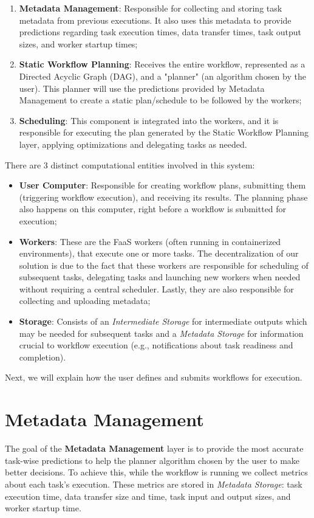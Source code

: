 \begin{enumerate}
    \item \textbf{Metadata Management}: Responsible for collecting and storing task metadata from previous executions. It also uses this metadata to provide predictions regarding task execution times, data transfer times, task output sizes, and worker startup times;
    \item \textbf{Static Workflow Planning}: Receives the entire workflow, represented as a Directed Acyclic Graph (DAG), and a "planner" (an algorithm chosen by the user). This planner will use the predictions provided by Metadata Management to create a static plan/schedule to be followed by the workers;
    \item \textbf{Scheduling}: This component is integrated into the workers, and it is responsible for executing the plan generated by the Static Workflow Planning layer, applying optimizations and delegating tasks as needed.
\end{enumerate}

There are 3 distinct computational entities involved in this system:

\begin{itemize}
    \item \textbf{User Computer}: Responsible for creating workflow plans, submitting them (triggering workflow execution), and receiving its results. The planning phase also happens on this computer, right before a workflow is submitted for execution;
    \item \textbf{Workers}: These are the FaaS workers (often running in containerized environments), that execute one or more tasks. The decentralization of our solution is due to the fact that these workers are responsible for scheduling of subsequent tasks, delegating tasks and launching new workers when needed without requiring a central scheduler. Lastly, they are also responsible for collecting and uploading metadata;
    \item \textbf{Storage}: Consists of an \textit{Intermediate Storage} for intermediate outputs which may be needed for subsequent tasks and a \textit{Metadata Storage} for information crucial to workflow execution (e.g., notifications about task readiness and completion).
\end{itemize}

Next, we will explain how the user defines and submits workflows for execution.
\section{Metadata Management}
\label{ss:metadata_management}
The goal of the \textbf{Metadata Management} layer is to provide the most accurate task-wise predictions to help the planner algorithm chosen by the user to make better decisions. To achieve this, while the workflow is running we collect metrics about each task's execution. These metrics are stored in \textit{Metadata Storage}: task execution time, data transfer size and time, task input and output sizes, and worker startup time. 

